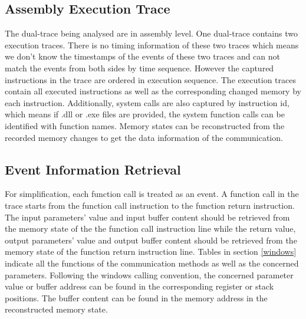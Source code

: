 \subsection{Assembly Execution Trace}
The dual-trace being analysed are in assembly level. One dual-trace contains two execution traces. There is no timing information of these two traces which means we don't know the timestamps of the events of these two traces and can not match the events from both sides by time sequence. However the captured instructions in the trace are ordered in execution sequence. The execution traces contain all executed instructions as well as the corresponding changed memory by each instruction. Additionally, system calls are also captured by instruction id, which means if .dll or .exe files are provided, the system function calls can be identified with function names. Memory states can be reconstructed from the recorded memory changes to get the data information of the communication. 

\subsection{Event Information Retrieval}
For simplification, each function call is treated as an event. A function call in the trace starts from the function call instruction to the function return instruction. The input parameters' value and input buffer content should be retrieved from the memory state of the the function call instruction line while the return value, output parameters' value and output buffer content should be retrieved from the memory state of the function return instruction line. Tables in section \ref{windows} indicate all the functions of the communication methods as well as the concerned parameters. Following the windows calling convention, the concerned parameter value or buffer address can be found in the corresponding register or stack positions. The buffer content can be found in the memory address in the reconstructed memory state. 

